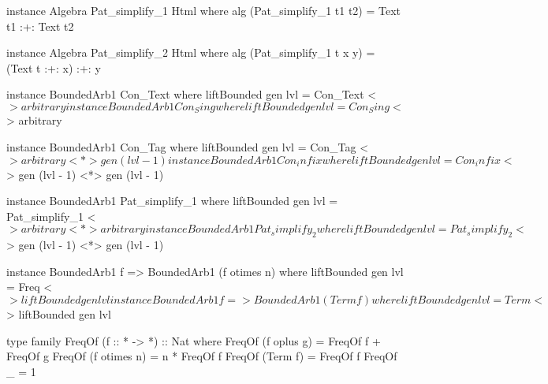 \begin{code}
instance Algebra Pat_simplify_1 Html where
  alg (Pat_simplify_1 t1 t2) = Text t1 :+: Text t2

instance Algebra Pat_simplify_2 Html where
  alg (Pat_simplify_1 t x y) = (Text t :+: x) :+: y
\end{code}


\begin{code}
instance BoundedArb1 Con_Text where
  liftBounded gen lvl = Con_Text <$> arbitrary

instance BoundedArb1 Con_Sing where
  liftBounded gen lvl = Con_Sing <$> arbitrary

instance BoundedArb1 Con_Tag where
  liftBounded gen lvl
    = Con_Tag <$> arbitrary <*> gen (lvl - 1)

instance BoundedArb1 Con_infix where
  liftBounded gen lvl
    = Con_infix <$> gen (lvl - 1) <*> gen (lvl - 1)
\end{code} %


\begin{code}
instance BoundedArb1 Pat_simplify_1 where
  liftBounded gen lvl
    = Pat_simplify_1 <$> arbitrary <*> arbitrary

instance BoundedArb1 Pat_simplify_2 where
  liftBounded gen lvl
    = Pat_simplify_2 <$> gen (lvl - 1) <*> gen (lvl - 1)
\end{code}


\begin{code}
instance BoundedArb1 f => BoundedArb1 (f otimes n) where
  liftBounded gen lvl = Freq <$> liftBounded gen lvl

instance BoundedArb1 f => BoundedArb1 (Term f) where
  liftBounded gen lvl = Term <$> liftBounded gen lvl
\end{code}


\begin{code}
type family FreqOf (f :: * -> *) :: Nat where
  FreqOf (f oplus g)   = FreqOf f + FreqOf g
  FreqOf (f otimes n)  = n * FreqOf f
  FreqOf (Term f)      = FreqOf f
  FreqOf _             = 1
\end{code}

